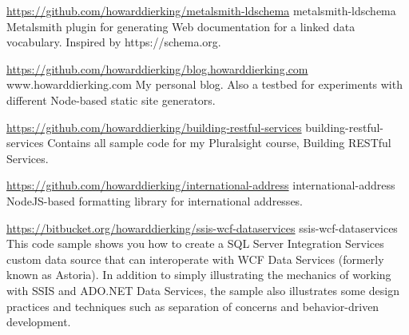 


\begin{cventries}


\cventry
{\url{https://github.com/howarddierking/metalsmith-ldschema}}  %
{metalsmith-ldschema}  %
{\enskip} %
{\enskip} %
{
  Metalsmith plugin for generating Web documentation for a linked data vocabulary. Inspired by https://schema.org.
}


\cventry
{\url{https://github.com/howarddierking/blog.howarddierking.com}}  %
{www.howarddierking.com}  %
{\enskip} %
{\enskip} %
{
  My personal blog. Also a testbed for experiments with different Node-based static site generators.
}


\cventry
{\url{https://github.com/howarddierking/building-restful-services}}  %
{building-restful-services}  %
{\enskip} %
{\enskip} %
{
  Contains all sample code for my Pluralsight course, Building RESTful Services.
}


\cventry
{\url{https://github.com/howarddierking/international-address}}  %
{international-address}  %
{\enskip} %
{\enskip} %
{
  NodeJS-based formatting library for international addresses.
}


\cventry
{\url{https://bitbucket.org/howarddierking/ssis-wcf-dataservices}}  %
{ssis-wcf-dataservices}  %
{\enskip} %
{\enskip} %
{
  This code sample shows you how to create a SQL Server Integration Services custom data source that can interoperate with WCF Data Services (formerly known as Astoria). In addition to simply illustrating the mechanics of working with SSIS and ADO.NET Data Services, the sample also illustrates some design practices and techniques such as separation of concerns and behavior-driven development.
}


\end{cventries}
